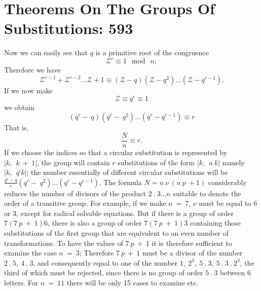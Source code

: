 \documentclass[11pt,fancy]{elegantbook}
\begin{document}
\section{Theorems On The Groups Of Substitutions: 593}

Now we can easily see that $q$ is a primitive root of the congruence
\begin{equation}
    \mathcal{Z}^r \equiv 1 \mod \ n;
\end{equation}
Therefore we have
\begin{equation}
    \mathcal{Z}^{r-1}+\mathcal{Z}^{r-2}\dots\mathcal{Z}+1\equiv(\mathcal{Z}-q)(\mathcal{Z}-q^2)\dots(\mathcal{Z}-q^{r-1}).
\end{equation}
If we now make
\begin{equation}
    \mathcal{Z}\equiv q^r\equiv1
\end{equation}
we obtain
\begin{equation}
    (q^r- \ q)(q^r- \ q^2) \dots (q^r-q^{r-1})\equiv r
\end{equation}
That is,
\begin{equation}
    \frac{N}{n}\equiv r.
\end{equation}
If we choose the indices so that a circular substitution is represented by $|k, \ \ {k \ + \ 1}|$, the group will contain $r$ substitutions of the form $|k, \ \ {a \ k}|$ namely  $|k, \ \ {q^{\imath}k}|$; the number essentially of different circular substitutions will be $\frac{q^{r}-q}{r} (q^r- \ q^2) \dots (q^r-q^{r-1})$. The formula  $N=n \ \nu \ (n \ p \ + 1)$ considerably reduces the number of divisors of the product $2 \ . \ 3 \dots n$ suitable to denote the order of a transitive group. For example, if we make $n \ = \ 7$, $\nu$ must be equal to 6 or 3, except for radical solvable equations. But if there is a group of order $7(7 \ p \ + \ 1)6$, there is also a group of order $7(7 \ p \ + \ 1)3$ containing those substitutions of the first group that are equivalent to an even number of transformations. To have the values of $7 \ p \ + \ 1$ it is therefore sufficient to examine the case $n \ = \ 3$; Therefore $7 \ p \ + \ 1$ must be a divisor of the number $2 \ . \ 5, \ 4 \ . \ 3$, and consequently equal to one of the number $1, \ 2^3, \ 5 \ . \ 3, \ 5 \ . \ 3 \ . \ 2^3$, the third of which must be rejected, since there is no group of order $5 \ . \ 3$ between 6 letters. For $n \ = \ 11$ there will be only 15 cases to examine etc.
\end{document}
